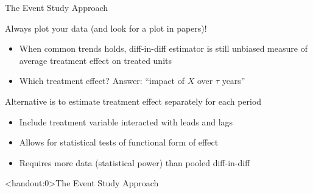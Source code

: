 \documentclass[10pt,xcolor=table,ignorenonframetext,handout,aspectratio=169]{beamer}
\newlength{\wideitemsep}
\let\olditem\item
\renewcommand{\item}{\setlength{\itemsep}{\wideitemsep}\olditem}
\begin{document}
\begin{frame}{The Event Study Approach}

\medskip
Always plot your data (and look for a plot in papers)!

\medskip
\begin{itemize}
	
	\item When common trends holds, diff-in-diff estimator is still unbiased measure of average treatment effect on treated units 
	
	\item Which treatment effect?  Answer: ``impact of $X$ over $\tau$ years''
	
\end{itemize}

\pause
\medskip
\medskip
Alternative is to estimate treatment effect separately for each period

\medskip
\begin{itemize}
	
	\item Include treatment variable interacted with leads and lags
	
	\item Allows for statistical tests of functional form of effect
	
	\item Requires more data (statistical power) than pooled diff-in-diff
	
\end{itemize}

\end{frame}




\begin{frame}<handout:0>{The Event Study Approach}

\begin{center}
\end{center}
\end{frame}
\end{document}
